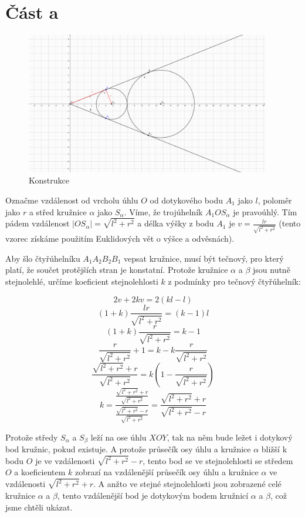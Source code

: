 \documentclass{fkssolpub}
\author{Ondřej Sedláček}
\begin{document}
\section{Část a}

\begin{figure}[h!]
	\begin{center}
		\includegraphics[width=0.95\textwidth]{3-fig.png}
	\end{center}
	\caption{Konstrukce}
	\label{fig:}
\end{figure}


Označme vzdálenost od vrcholu úhlu $O$ od dotykového bodu $A_1$ jako $l$,
poloměr jako $r$ a střed kružnice $\alpha$ jako $S_{\alpha}$. Víme, že
trojúhelník $A_1 O S_{\alpha}$ je pravoúhlý. Tím pádem vzdálenost
$|OS_{\alpha}| = \sqrt{l^2 + r^2}$ a délka výšky z bodu $A_1$ je
$v = \frac{l r}{\sqrt{l^2 + r^2}}$ (tento vzorec získáme použitím Euklidových
vět o výšce a odvěsnách).

Aby šlo čtyřúhelníku $A_1A_2B_2B_1$ vepsat kružnice, musí být tečnový,
pro který platí, že součet protějších stran je konstatní. Protože kružnice
$\alpha$ a $\beta$ jsou nutně stejnolehlé, určíme koeficient stejnolehlosti
$k$ z podmínky pro tečnový čtyřúhelník:

\[
	2 v + 2 k v = 2 (kl - l)
\]
\[
	(1 + k) \frac{l r}{\sqrt{l^2 + r^2}} = (k - 1) l
\]
\[
	(1 + k) \frac{r}{\sqrt{l^2 + r^2}} = k - 1
\]
\[
	\frac{r}{\sqrt{l^2 + r^2}} + 1 = k - k \frac{r}{\sqrt{l^2 + r^2}}
\]
\[
	\frac{\sqrt{l^2 + r^2} + r}{\sqrt{l^2 + r^2}} = k \left(1 - \frac{r}{\sqrt{l^2 + r^2}}\right)
\]
\[
	k = \frac{\frac{\sqrt{l^2 + r^2} + r}{\sqrt{l^2 + r^2}}}{\frac{\sqrt{l^2 + r^2} - r}{\sqrt{l^2 + r^2}}}
	= \frac{\sqrt{l^2 + r^2} + r}{\sqrt{l^2 + r^2} - r}
\]

Protože středy $S_{\alpha}$ a $S_{\beta}$ leží na ose úhlu $XOY$, tak na něm
bude ležet i dotykový bod kružnic, pokud existuje. A protože průsečík
osy úhlu a kružnice $\alpha$ bližší k bodu $O$ je ve vzdálenosti
$\sqrt{l^2 + r^2} - r$, tento bod se ve stejnolehlosti se středem $O$ a
koeficientem $k$ zobrazí na vzdálenější průsečík osy úhlu a kružnice $\alpha$
ve vzdálenosti $\sqrt{l^2 + r^2} + r$. A anžto ve stejné stejnolehlosti
jsou zobrazené celé kružnice $\alpha$ a $\beta$, tento vzdálenější bod je
dotykovým bodem kružnicí $\alpha$ a $\beta$, což jsme chtěli ukázat.
\end{document}
